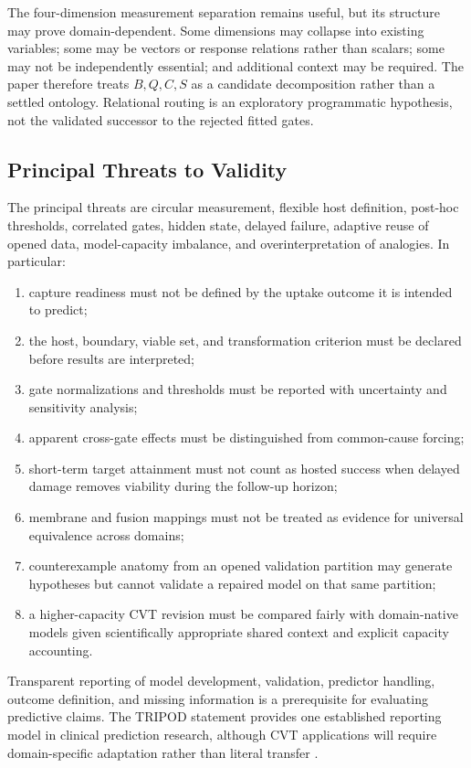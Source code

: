 \documentclass[11pt]{article}
\begin{document}
The four-dimension measurement separation remains useful, but its structure may prove domain-dependent. Some dimensions may collapse into existing variables; some may be vectors or response relations rather than scalars; some may not be independently essential; and additional context may be required. The paper therefore treats \(B,Q,C,S\) as a candidate decomposition rather than a settled ontology. Relational routing is an exploratory programmatic hypothesis, not the validated successor to the rejected fitted gates.

\subsection{Principal Threats to Validity}

The principal threats are circular measurement, flexible host definition, post-hoc thresholds, correlated gates, hidden state, delayed failure, adaptive reuse of opened data, model-capacity imbalance, and overinterpretation of analogies. In particular:
\begin{enumerate}[label=(\roman*)]
    \item capture readiness must not be defined by the uptake outcome it is intended to predict;
    \item the host, boundary, viable set, and transformation criterion must be declared before results are interpreted;
    \item gate normalizations and thresholds must be reported with uncertainty and sensitivity analysis;
    \item apparent cross-gate effects must be distinguished from common-cause forcing;
    \item short-term target attainment must not count as hosted success when delayed damage removes viability during the follow-up horizon;
    \item membrane and fusion mappings must not be treated as evidence for universal equivalence across domains;
    \item counterexample anatomy from an opened validation partition may generate hypotheses but cannot validate a repaired model on that same partition;
    \item a higher-capacity CVT revision must be compared fairly with domain-native models given scientifically appropriate shared context and explicit capacity accounting.
\end{enumerate}

Transparent reporting of model development, validation, predictor handling, outcome definition, and missing information is a prerequisite for evaluating predictive claims. The TRIPOD statement provides one established reporting model in clinical prediction research, although CVT applications will require domain-specific adaptation rather than literal transfer \cite{collins2015}.
\end{document}

